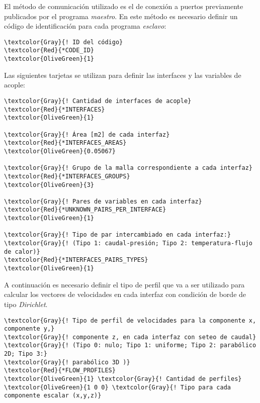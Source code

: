 El método de comunicación utilizado es el de conexión a puertos previamente publicados por el programa \textit{maestro}.
En este método es necesario definir un código de identificación para cada programa \textit{esclavo}:
\begin{Verbatim}[frame=single,commandchars=\\\{\}]
\textcolor{Gray}{! ID del código}
\textcolor{Red}{*CODE_ID}
\textcolor{OliveGreen}{1}
\end{Verbatim}

Las siguientes tarjetas se utilizan para definir las interfaces y las variables de acople:
\begin{Verbatim}[frame=single,commandchars=\\\{\}]
\textcolor{Gray}{! Cantidad de interfaces de acople}
\textcolor{Red}{*INTERFACES}
\textcolor{OliveGreen}{1}

\textcolor{Gray}{! Área [m2] de cada interfaz}
\textcolor{Red}{*INTERFACES_AREAS}
\textcolor{OliveGreen}{0.05067}

\textcolor{Gray}{! Grupo de la malla correspondiente a cada interfaz}
\textcolor{Red}{*INTERFACES_GROUPS}
\textcolor{OliveGreen}{3}

\textcolor{Gray}{! Pares de variables en cada interfaz}
\textcolor{Red}{*UNKNOWN_PAIRS_PER_INTERFACE}
\textcolor{OliveGreen}{1}

\textcolor{Gray}{! Tipo de par intercambiado en cada interfaz:}
\textcolor{Gray}{! (Tipo 1: caudal-presión; Tipo 2: temperatura-flujo de calor)}
\textcolor{Red}{*INTERFACES_PAIRS_TYPES}
\textcolor{OliveGreen}{1}
\end{Verbatim}

A continuación es necesario definir el tipo de perfil que va a ser utilizado para calcular los vectores de velocidades en cada interfaz con condición de borde de tipo \textit{Dirichlet}.
\begin{Verbatim}[frame=single,commandchars=\\\{\}]
\textcolor{Gray}{! Tipo de perfil de velocidades para la componente x, componente y,}
\textcolor{Gray}{! componente z, en cada interfaz con seteo de caudal}
\textcolor{Gray}{! (Tipo 0: nulo; Tipo 1: uniforme; Tipo 2: parabólico 2D; Tipo 3:}
\textcolor{Gray}{! parabólico 3D )}
\textcolor{Red}{*FLOW_PROFILES}
\textcolor{OliveGreen}{1} \textcolor{Gray}{! Cantidad de perfiles}
\textcolor{OliveGreen}{1 0 0} \textcolor{Gray}{! Tipo para cada componente escalar (x,y,z)}
\end{Verbatim}

